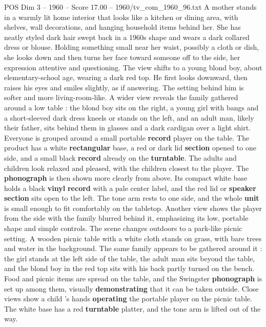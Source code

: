 \begin{textsample}{POS Dim 3 – 1960 – Score 17.00 – 1960/tv\_com\_1960\_96.txt}  \label{ex:f3_pos_025}
A mother stands in a warmly lit home interior that looks like a kitchen or dining area, with shelves, wall decorations, and hanging household items behind her.
She has neatly styled dark hair swept back in a 1960s shape and wears a dark collared dress or blouse.
Holding something small near her waist, possibly a cloth or dish, she looks down and then turns her face toward someone off to the side, her expression attentive and questioning.
The view shifts to a young blond boy, about elementary-school age, wearing a dark red top.
He first looks downward, then raises his eyes and smiles slightly, as if answering.
The setting behind him is softer and more living-room-like.
A wider view reveals the family gathered around a low table : the blond boy sits on the right, a young girl with bangs and a short-sleeved dark dress kneels or stands on the left, and an adult man, likely their father, sits behind them in glasses and a dark cardigan over a light shirt.
Everyone is grouped around a small portable \textbf{record} player on the table.
The product has a white \textbf{rectangular} base, a red or dark lid \textbf{section} opened to one side, and a small black \textbf{record} already on the \textbf{turntable}.
The adults and children look relaxed and pleased, with the children closest to the player.
The \textbf{phonograph} is then shown more clearly from above.
Its compact white base holds a black \textbf{vinyl} \textbf{record} with a pale center label, and the red lid or \textbf{speaker} \textbf{section} sits open to the left.
The tone arm rests to one side, and the whole \textbf{unit} is small enough to fit comfortably on the tabletop.
Another view shows the player from the side with the family blurred behind it, emphasizing its low, portable shape and simple controls.
The scene changes outdoors to a park-like picnic setting.
A wooden picnic table with a white cloth stands on grass, with bare trees and water in the background.
The same family appears to be gathered around it : the girl stands at the left side of the table, the adult man sits beyond the table, and the blond boy in the red top sits with his back partly turned on the bench.
Food and picnic items are spread on the table, and the Swingster \textbf{phonograph} is set up among them, visually \textbf{demonstrating} that it can be taken outside.
Close views show a child ’s hands \textbf{operating} the portable player on the picnic table.
The white base has a red \textbf{turntable} platter, and the tone arm is lifted out of the way.

\end{textsample}
